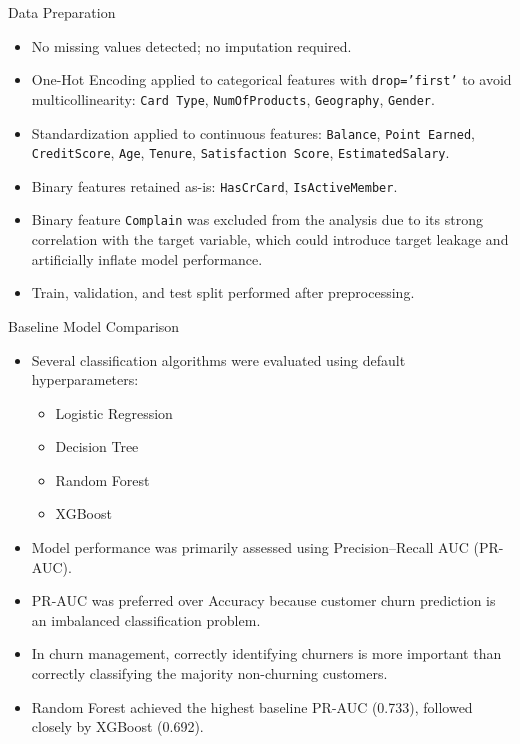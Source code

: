 \begin{frame}{Data Preparation}
\begin{itemize}
    \item No missing values detected; no imputation required.
    \item One-Hot Encoding applied to categorical features with \texttt{drop='first'} to avoid multicollinearity:
    \texttt{Card Type}, \texttt{NumOfProducts}, \texttt{Geography}, \texttt{Gender}.
    \item Standardization applied to continuous features:
    \texttt{Balance}, \texttt{Point Earned}, \texttt{CreditScore},
    \texttt{Age}, \texttt{Tenure}, \texttt{Satisfaction Score},
    \texttt{EstimatedSalary}.
    \item Binary features retained as-is:
    \texttt{HasCrCard}, \texttt{IsActiveMember}.
    \item Binary feature \texttt{Complain} was excluded from the analysis due to its strong correlation 
    with the target variable, which could introduce target leakage and artificially inflate model performance. 
    \item Train, validation, and test split performed after preprocessing.
\end{itemize}
\end{frame}

\begin{frame}{Baseline Model Comparison}
\begin{itemize}
\item Several classification algorithms were evaluated using default hyperparameters:
\begin{itemize}
\item Logistic Regression
\item Decision Tree
\item Random Forest
\item XGBoost
\end{itemize}

\item Model performance was primarily assessed using Precision--Recall AUC (PR-AUC).

\item PR-AUC was preferred over Accuracy because customer churn prediction is an imbalanced classification problem.

\item In churn management, correctly identifying churners is more important than correctly classifying the majority non-churning customers.

\item Random Forest achieved the highest baseline PR-AUC (0.733), followed closely by XGBoost (0.692).

\end{itemize}
\end{frame}

